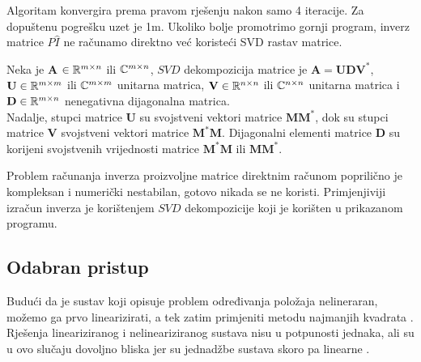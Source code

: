\documentclass[a4paper,twoside,12pt]{memoir} %
\begin{document}
Algoritam konvergira prema 
pravom rješenju nakon samo 4 iteracije.
Za dopuštenu pogrešku uzet je 1m.
Ukoliko bolje promotrimo gornji program, inverz matrice $P\hat{I}$ ne računamo direktno već koristeći SVD rastav matrice.
\begin{defn}
	Neka je \textbf{A} $\in \mathbb{R}^{m\times n}$ ili $\mathbb{C}^{m \times n}$, $SVD$ dekompozicija matrice je $\mathbf{A} = \mathbf{UDV}^*$, $\mathbf{U} \in \mathbb{R}^{m\times m}$ ili $\mathbb{C}^{m\times m}$ unitarna matrica, $\mathbf{V} \in \mathbb{R}^{n\times n}$ ili $\mathbb{C}^{n\times n}$ unitarna matrica i $\mathbf{D} \in \mathbb{R}^{m\times n}$ nenegativna dijagonalna matrica. \\
	Nadalje, stupci matrice \textbf{U} su svojstveni vektori matrice $\mathbf{MM}^*$, dok su stupci matrice \textbf{V} 
	svojstveni vektori matrice $\mathbf{M}^*\mathbf{M}$. Dijagonalni elementi matrice $\mathbf{D}$ su korijeni svojstvenih vrijednosti matrice $\mathbf{M}^*\mathbf{M}$ ili $\mathbf{MM}^*$.
\end{defn}

Problem računanja inverza proizvoljne matrice direktnim računom poprilično je kompleksan i numerički nestabilan, gotovo nikada se ne koristi. 
Primjenjiviji izračun inverza je korištenjem $SVD$ dekompozicije koji je korišten u prikazanom programu.

\subsection{Odabran pristup}
Budući da je sustav koji opisuje problem određivanja položaja nelineraran, 
možemo ga prvo linearizirati, a tek zatim primjeniti metodu najmanjih kvadrata \cite{googleSchoolar1}.
Rješenja lineariziranog i nelineariziranog sustava nisu u potpunosti jednaka, ali su u ovo slučaju dovoljno bliska jer su jednadžbe sustava skoro pa linearne \cite{singer07}.%
\end{document}

